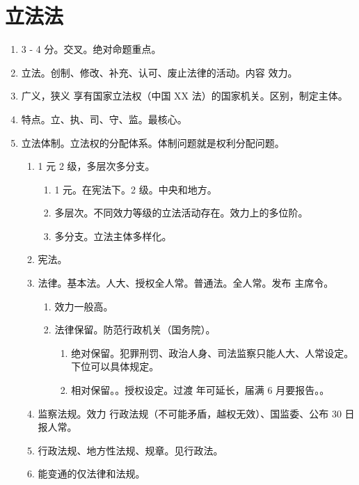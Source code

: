 \section{立法法}
\begin{enumerate}
  \item 3 - 4 分。交叉。绝对命题重点。
  \item 立法。创制、修改、补充、认可、废止法律的活动。内容 \hz 效力。
  \item 广义，狭义 \yjt 享有国家立法权（中国 XX 法）的国家机关。区别，制定主体。
  \item 特点。立、执、司、守、监。最核心。
  \item 立法体制。立法权的分配体系。体制问题就是权利分配问题。
        \begin{enumerate}
          \item 1 元 2 级，多层次多分支。
                \begin{enumerate}
                  \item 1 元。在宪法下。2 级。中央和地方。
                  \item 多层次。不同效力等级的立法活动存在。效力上的多位阶。
                  \item 多分支。立法主体多样化。
                \end{enumerate}
          \item 宪法。
          \item 法律。\yi 基本法。人大、授权全人常。\er 普通法。全人常。发布 \yjt 主席令。
                \begin{enumerate}
                  \item 效力一般高。
                  \item 法律保留。防范行政机关（国务院）。
                        \begin{enumerate}
                          \item 绝对保留。犯罪刑罚、政治人身、司法监察只能人大、人常设定。下位可以具体规定。
                          \item 相对保留。。授权设定。过渡  年可延长，届满 6 月要报告。。
                        \end{enumerate}
                \end{enumerate}
          \item 监察法规。效力 \ydy 行政法规（不可能矛盾，越权无效）、国监委、公布 30 日报人常。
          \item 行政法规、地方性法规、规章。见行政法。
          \item 能变通的仅法律和法规。

\end{enumerate}
\end{enumerate}
